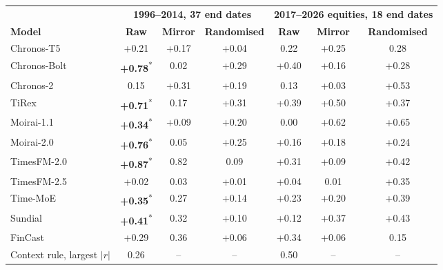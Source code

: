 \begin{tabular}{@{}lcccccc@{}}
\toprule
 & \multicolumn{3}{c}{\textbf{1996--2014, 37 end dates}} & \multicolumn{3}{c}{\textbf{2017--2026 equities, 18 end dates}} \\
\cmidrule(lr){2-4}\cmidrule(lr){5-7}
\textbf{Model} & \textbf{Raw} & \textbf{Mirror} & \textbf{Randomised} & \textbf{Raw} & \textbf{Mirror} & \textbf{Randomised} \\
\midrule
Chronos-T5 & +0.21 & +0.17 & +0.04 & \textminus{}0.22 & +0.25 & \textminus{}0.28 \\
Chronos-Bolt & \textbf{+0.78}\textsuperscript{*} & \textminus{}0.02 & +0.29 & +0.40 & +0.16 & +0.28 \\
Chronos-2 & \textminus{}0.15 & +0.31 & +0.19 & \textminus{}0.13 & +0.03 & +0.53 \\
TiRex & \textbf{+0.71}\textsuperscript{*} & \textminus{}0.17 & +0.31 & +0.39 & +0.50 & +0.37 \\
Moirai-1.1 & \textbf{+0.34}\textsuperscript{*} & +0.09 & +0.20 & \textminus{}0.00 & +0.62 & +0.65 \\
Moirai-2.0 & \textbf{+0.76}\textsuperscript{*} & \textminus{}0.05 & +0.25 & +0.16 & +0.18 & +0.24 \\
TimesFM-2.0 & \textbf{+0.87}\textsuperscript{*} & \textminus{}0.82 & \textminus{}0.09 & +0.31 & +0.09 & +0.42 \\
TimesFM-2.5 & +0.02 & \textminus{}0.03 & +0.01 & +0.04 & \textminus{}0.01 & +0.35 \\
Time-MoE & \textbf{+0.35}\textsuperscript{*} & \textminus{}0.27 & +0.14 & +0.23 & +0.20 & +0.39 \\
Sundial & \textbf{+0.41}\textsuperscript{*} & \textminus{}0.32 & +0.10 & +0.12 & +0.37 & +0.43 \\
FinCast & +0.29 & \textminus{}0.36 & +0.06 & +0.34 & +0.06 & \textminus{}0.15 \\
\addlinespace[3pt]
Context rule, largest $|r|$ & 0.26 & -- & -- & 0.50 & -- & -- \\
\bottomrule
\end{tabular}
